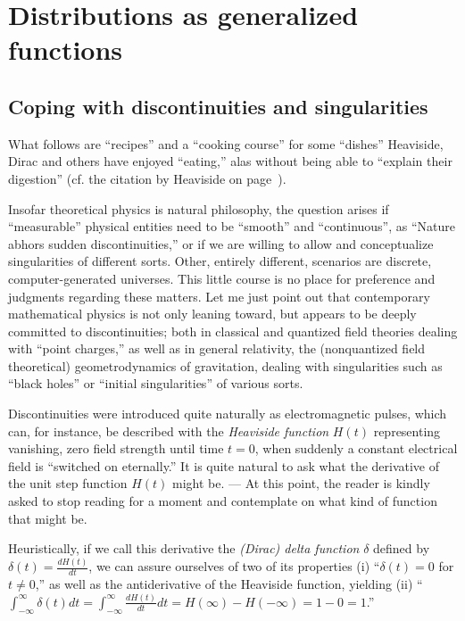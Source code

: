 \chapter{Distributions as generalized functions}
\label{2011-m-ch:gf}

\section{Coping with discontinuities and singularities}

What follows are ``recipes'' and a ``cooking course'' for some ``dishes'' Heaviside, Dirac and others
have enjoyed ``eating,'' alas without being able to ``explain their digestion''
(cf. the citation by Heaviside on page~\pageref{2013-m-ch-intro-cooking}).

Insofar theoretical physics is natural philosophy,
the question arises if ``measurable'' physical entities need to be ``smooth'' and ``continuous'',\cite{trench}
as ``Nature abhors sudden discontinuities,''
or if we are willing to allow and conceptualize singularities of different sorts.
Other, entirely different,
scenarios are discrete,
computer-generated universes.
This little course is no place for preference and judgments regarding these matters.
Let me just point out that contemporary mathematical physics is not only leaning toward,
but appears to be deeply committed to discontinuities;
both in classical and quantized field theories dealing with
 ``point charges,''
as well as in general relativity,  the (nonquantized field theoretical)
geometrodynamics of gravitation,
dealing with singularities such as ``black holes'' or ``initial singularities'' of various sorts.

Discontinuities were introduced quite naturally as electromagnetic pulses,
which can, for instance, be described with the {\em Heaviside function}
$H(t)$ representing vanishing, zero field strength until time $t=0$, when suddenly a constant electrical field is
``switched on eternally.''
It is quite natural to ask what the derivative of the unit step function $H(t)$ might be.
---
At this point, the reader is kindly asked to stop reading for a moment and contemplate
on what kind of function that might be.

Heuristically, if we call this derivative the {\em (Dirac) delta function} $\delta$ defined by
$\delta (t)= \frac{d H(t)}{dt}$,
we can assure ourselves of two of its properties
(i) ``$\delta (t) =0$ for $t\neq 0$,''
as well as the antiderivative of the Heaviside function, yielding
(ii) ``$\int_{-\infty}^\infty \delta (t) dt  = \int_{-\infty}^\infty \frac{d H(t)}{dt} dt  =
H(\infty ) - H(-\infty ) = 1-0=1$.''

